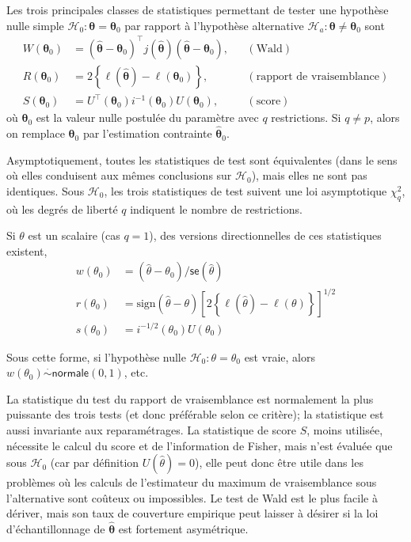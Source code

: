 \documentclass[
  11pt,
  letterpaper,
]{scrbook}
\theoremstyle{plain}
\theoremstyle{plain}
\theoremstyle{definition}
\theoremstyle{definition}
\theoremstyle{remark}
\begin{document}
Les trois principales classes de statistiques permettant de tester une
hypothèse nulle simple
\(\mathscr{H}_0 : \boldsymbol{\theta}=\boldsymbol{\theta}_0\) par
rapport à l'hypothèse alternative
\(\mathscr{H}_a : \boldsymbol{\theta} \neq \boldsymbol{\theta}_0\) sont
\begin{align*}
 W(\boldsymbol{\theta}_0) &= (\widehat{\boldsymbol{\theta}}-\boldsymbol{\theta}_0)^\top j(\widehat{\boldsymbol{\theta}})(\widehat{\boldsymbol{\theta}}-\boldsymbol{\theta}_0), &&(\text{Wald}) \\
 R(\boldsymbol{\theta}_0) &= 2 \left\{ \ell(\widehat{\boldsymbol{\theta}})-\ell(\boldsymbol{\theta}_0)\right\}, &&(\text{rapport de vraisemblance})\\
 S(\boldsymbol{\theta}_0) &= U^\top(\boldsymbol{\theta}_0)i^{-1}(\boldsymbol{\theta}_0)U(\boldsymbol{\theta}_0), && (\text{score})
\end{align*} où \(\boldsymbol{\theta}_0\) est la valeur nulle postulée
du paramètre avec \(q\) restrictions. Si \(q \neq p\), alors on remplace
\(\boldsymbol{\theta}_0\) par l'estimation contrainte
\(\widehat{\boldsymbol{\theta}}_0\).

Asymptotiquement, toutes les statistiques de test sont équivalentes
(dans le sens où elles conduisent aux mêmes conclusions sur
\(\mathscr{H}_0\)), mais elles ne sont pas identiques. Sous
\(\mathscr{H}_0\), les trois statistiques de test suivent une loi
asymptotique \(\chi^2_q\), où les degrés de liberté \(q\) indiquent le
nombre de restrictions.

Si \(\theta\) est un scalaire (cas \(q=1\)), des versions
directionnelles de ces statistiques existent, \begin{align*}
w(\theta_0)&=(\widehat{\theta}-\theta_0)/\mathsf{se}(\widehat{\theta})  \\
r({\theta_0}) &= \mathrm{sign}(\widehat{\theta}-\theta)\left[2
\left\{\ell(\widehat{\theta})-\ell(\theta)\right\}\right]^{1/2}  \\
s(\theta_0)&=i^{-1/2}(\theta_0)U(\theta_0)
\end{align*}

Sous cette forme, si l'hypothèse nulle
\(\mathscr{H}_0: \theta = \theta_0\) est vraie, alors
\(w(\theta_0)\stackrel{\cdot}{\sim} \mathsf{normale}(0,1)\), etc.

La statistique du test du rapport de vraisemblance est normalement la
plus puissante des trois tests (et donc préférable selon ce critère); la
statistique est aussi invariante aux reparamétrages. La statistique de
score \(S\), moins utilisée, nécessite le calcul du score et de
l'information de Fisher, mais n'est évaluée que sous \(\mathscr{H}_0\)
(car par définition \(U(\widehat{\theta})=0\)), elle peut donc être
utile dans les problèmes où les calculs de l'estimateur du maximum de
vraisemblance sous l'alternative sont coûteux ou impossibles. Le test de
Wald est le plus facile à dériver, mais son taux de couverture empirique
peut laisser à désirer si la loi d'échantillonnage de
\(\widehat{\boldsymbol{\theta}}\) est fortement asymétrique.
\end{document}
